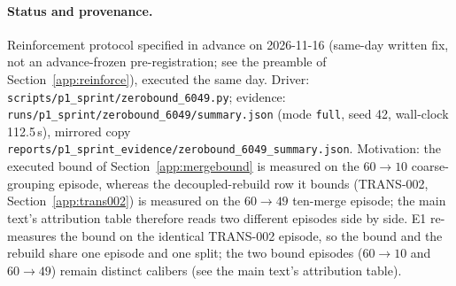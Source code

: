 \documentclass[11pt,a4paper]{article}
\begin{document}
\paragraph{Status and provenance.}
Reinforcement protocol specified in advance on 2026-11-16 (same-day written fix, not an advance-frozen pre-registration; see the preamble of Section~\ref{app:reinforce}), executed the same day. Driver: \texttt{scripts/p1\_sprint/zerobound\_6049.py}; evidence: \texttt{runs/p1\_sprint/zerobound\_6049/summary.json} (mode \texttt{full}, seed 42, wall-clock 112.5\,s), mirrored copy \texttt{reports/p1\_sprint\_evidence/zerobound\_6049\_summary.json}. Motivation: the executed bound of Section~\ref{app:mergebound} is measured on the $60\to10$ coarse-grouping episode, whereas the decoupled-rebuild row it bounds (TRANS-002, Section~\ref{app:trans002}) is measured on the $60\to49$ ten-merge episode; the main text's attribution table therefore reads two different episodes side by side. E1 re-measures the bound on the identical TRANS-002 episode, so the bound and the rebuild share one episode and one split; the two bound episodes ($60\to10$ and $60\to49$) remain distinct calibers (see the main text's attribution table).
\end{document}
